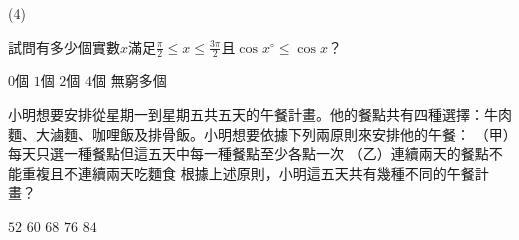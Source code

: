 \begin{QUESTIONS}
\begin{QUESTION}
\begin{QBODY}
    \end{QBODY}
    \begin{QFROMS}
    \end{QFROMS}
    \begin{QTAGS}
    \end{QTAGS}
    \begin{QANS}
        (4)
    \end{QANS}
    \begin{QSOL}
    \end{QSOL}
    \begin{QEMPTYSPACE}
    \end{QEMPTYSPACE}
\end{QUESTION}
\begin{QUESTION}
    \begin{QBODY}
        試問有多少個實數$x$滿足$\frac{\pi }{2}\le x\le \frac{3\pi }{2}$且$\cos x{}^\circ \le \cos x$？
        \begin{QOPS}
            \QOP $0$個     
            \QOP $1$個     
            \QOP $2$個     
            \QOP $4$個     
            \QOP 無窮多個
        \end{QOPS}
    \end{QBODY}
    \begin{QFROMS}
    \end{QFROMS}
    \begin{QTAGS}
    \end{QTAGS}
    \begin{QANS}
    \end{QANS}
    \begin{QSOL}
    \end{QSOL}
    \begin{QEMPTYSPACE}
    \end{QEMPTYSPACE}
\end{QUESTION}
\begin{QUESTION}
    \begin{QBODY}
        小明想要安排從星期一到星期五共五天的午餐計畫。他的餐點共有四種選擇：牛肉麵、大滷麵、咖哩飯及排骨飯。小明想要依據下列兩原則來安排他的午餐：
        （甲）每天只選一種餐點但這五天中每一種餐點至少各點一次
        （乙）連續兩天的餐點不能重複且不連續兩天吃麵食
        根據上述原則，小明這五天共有幾種不同的午餐計畫？
        \begin{QOPS}
            \QOP $52$      
            \QOP $60$      
            \QOP $68$      
            \QOP $76$      
            \QOP $84$
        \end{QOPS}
            

\end{QBODY}
\end{QUESTION}
\end{QUESTIONS}
